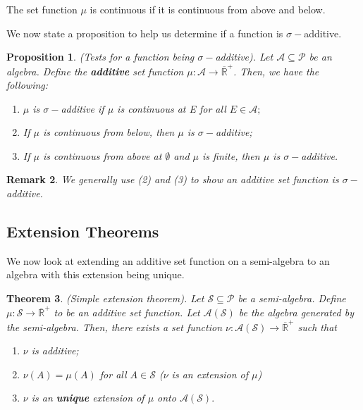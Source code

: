 \documentclass[twoside]{article}
\newcounter{lecnum}
\newtheorem{theorem}{Theorem}[lecnum]
\newtheorem{proposition}[theorem]{Proposition}
\newtheorem{remark}[theorem]{Remark}
\newcommand{\algebra}{\mathcal{A}}
\newcommand{\semialgebra}{\mathcal{S}}
\newcommand{\powerset}{\mathcal{P}}
\newcommand{\positiveextendedreal}{\overline{\mathbb{R}}^+}
\begin{document}
The set function $\mu$ is continuous if it is continuous from above and below. 

We now state a proposition to help us determine if a function is $\sigma-$additive.

\begin{proposition}(Tests for a function being $\sigma-$additive). Let $\algebra \subseteq \powerset$ be an algebra. Define the \textbf{additive} set function $\mu: \algebra \rightarrow \positiveextendedreal$. Then, we have the following:
\begin{enumerate}
\item $\mu$ is $\sigma-$additive if $\mu$ is continuous at E for all $E \in \algebra;$
\item If $\mu$ is continuous from below, then $\mu$ is $\sigma-$additive;
\item If $\mu$ is continuous from above at $\emptyset$ and $\mu$ is finite, then $\mu$ is $\sigma-$additive.
\end{enumerate}
\end{proposition}

\begin{remark}We generally use (2) and (3) to show an additive set function is $\sigma-$additive.
\end{remark}

\subsection{Extension Theorems}

We now look at extending an additive set function on a semi-algebra to an algebra with this extension being unique.
\begin{theorem}(Simple extension theorem). Let $\semialgebra \subseteq \powerset$ be a semi-algebra. Define $\mu: \semialgebra \rightarrow \positiveextendedreal$ to be an additive set function. Let $\algebra (\semialgebra)$ be the algebra generated by the semi-algebra. Then, there exists a set function $\nu: \algebra (\semialgebra) \rightarrow \positiveextendedreal$ such that 
\begin{enumerate}
\item $\nu$ is additive;
\item $\nu(A) = \mu(A)$ for all $A \in \semialgebra$ ($\nu$ is an extension of $\mu$)
\item $\nu$ is an \textbf{unique} extension of $\mu$ onto $\algebra (\semialgebra).$
\end{enumerate}
\end{theorem}
\end{document}
